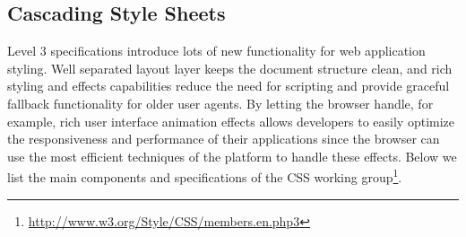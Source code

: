 \subsection{Cascading Style Sheets}
\label{section:css}

 Level 3 specifications introduce lots of new functionality
for web application styling. Well separated layout layer keeps the
document structure clean, and rich styling and effects capabilities
reduce the need for scripting and provide graceful fallback
functionality for older user agents. By letting the browser handle,
for example, rich user interface animation effects allows developers
to easily optimize the responsiveness and performance of their
applications since the browser can use the most efficient techniques
of the platform to handle these effects. Below we list the main
components and specifications of the  CSS working
group\footnote{\url{http://www.w3.org/Style/CSS/members.en.php3}}.

